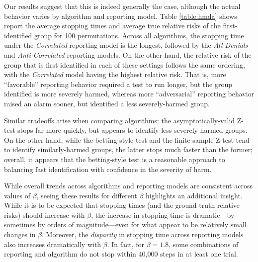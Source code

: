 Our results suggest that this is indeed generally the case, although the actual behavior varies by algorithm and reporting model. Table \ref{table:hmda} shows report the average stopping times and average true relative risks of the first-identified group for 100 permutations\iftoggle{icml}{, for $\beta = 1.6$ (see Appendix \ref{app:expts} for results for all $\beta$)}{}. 
Across all algorithms\iftoggle{icml}{}{ and values of $\beta$}, the stopping time under the \textit{Correlated} reporting model is the longest, followed by the \textit{All Denials} and \textit{Anti-Correlated} reporting models. On the other hand, the relative risk of the group that is first identified in each of these settings follows the same ordering, with the \textit{Correlated} model having the highest relative risk. That is, more ``favorable'' reporting behavior required a test to run longer, but the group identified is more severely harmed, whereas more ``adversarial'' reporting behavior raised an alarm sooner, but identified a less severely-harmed group. 

Similar tradeoffs arise when comparing algorithms: the asymptotically-valid Z-test stops far more quickly, but appears to identify less severely-harmed groups. On the other hand, while the betting-style test and the finite-sample Z-test tend to identify similarly-harmed groups, the latter stops much faster than the former; overall, it appears that the betting-style test is a reasonable approach to balancing fast identification with confidence in the severity of harm. 

While overall trends across algorithms and reporting models are consistent across values of $\beta$, seeing these results for different $\beta$ highlights an additional insight. 
While it is to be expected that stopping times (and the ground-truth relative risks) should increase with $\beta$, the increase in stopping time is dramatic---by sometimes by orders of magnitude---even for what appear to be relatively small changes in $\beta$. Moreover, the \textit{disparity} in stopping time across reporting models also increases dramatically with $\beta$. In fact, for $\beta=1.8$, some combinations of reporting and algorithm do not stop within 40,000 steps in at least one trial. 

